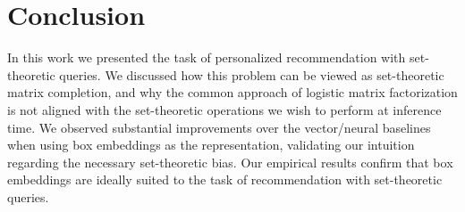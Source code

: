 \vspace{-4pt}
\section{Conclusion}
\vspace{-4pt}
In this work we presented the task of personalized recommendation with set-theoretic queries. We discussed how this problem can be viewed as set-theoretic matrix completion, and why the common approach of logistic matrix factorization is not aligned with the set-theoretic operations we wish to perform at inference time.
We observed substantial improvements over the vector/neural baselines when using box embeddings as the representation, validating our intuition regarding the necessary set-theoretic bias.
Our empirical results confirm that box embeddings are ideally suited to the task of recommendation with set-theoretic queries.